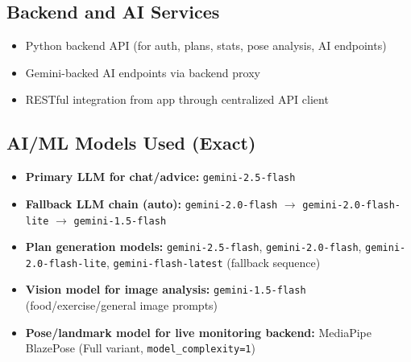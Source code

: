 \documentclass[12pt,a4paper]{article}
\begin{document}
\subsection{Backend and AI Services}
\begin{itemize}[leftmargin=1.2cm]
  \item Python backend API (for auth, plans, stats, pose analysis, AI endpoints)
  \item Gemini-backed AI endpoints via backend proxy
  \item RESTful integration from app through centralized API client
\end{itemize}

\subsection{AI/ML Models Used (Exact)}
\begin{itemize}[leftmargin=1.2cm]
  \item \textbf{Primary LLM for chat/advice:} \texttt{gemini-2.5-flash}
  \item \textbf{Fallback LLM chain (auto):} \texttt{gemini-2.0-flash} $\rightarrow$ \texttt{gemini-2.0-flash-lite} $\rightarrow$ \texttt{gemini-1.5-flash}
  \item \textbf{Plan generation models:} \texttt{gemini-2.5-flash}, \texttt{gemini-2.0-flash}, \texttt{gemini-2.0-flash-lite}, \texttt{gemini-flash-latest} (fallback sequence)
  \item \textbf{Vision model for image analysis:} \texttt{gemini-1.5-flash} (food/exercise/general image prompts)
  \item \textbf{Pose/landmark model for live monitoring backend:} MediaPipe BlazePose (Full variant, \texttt{model\_complexity=1})
\end{itemize}
\end{document}
